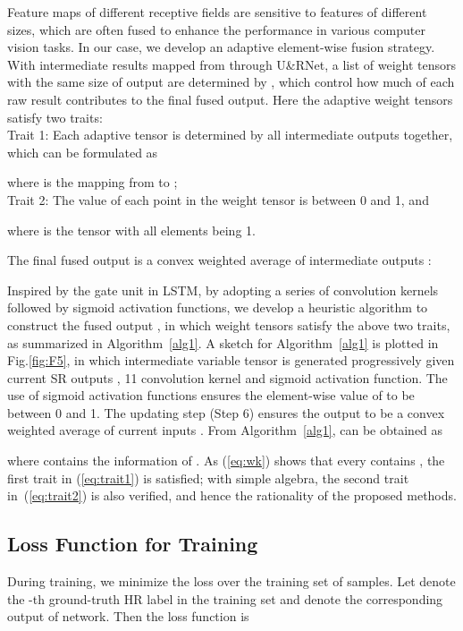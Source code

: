 \documentclass[journal]{IEEEtran}
\begin{document}
Feature maps of different receptive fields are sensitive to features of different sizes, which are often fused to enhance the performance in various computer vision tasks. In our case, we develop an adaptive element-wise fusion strategy. With  intermediate results  mapped from  through U\&RNet, a list of weight tensors  with the same size of output are determined by , which control how much of each raw result contributes to the final fused output. Here the adaptive weight tensors satisfy two traits:\\
Trait 1: Each adaptive tensor is determined by all intermediate outputs together, which can be formulated as

where  is the mapping from  to ;\\
Trait 2: The value of each point in the weight tensor is between 0 and 1, and

where  is the tensor with all elements being 1. 

The final fused output  is a convex weighted average of intermediate outputs : 


Inspired by the gate unit in LSTM, by adopting a series of  convolution kernels followed by sigmoid activation functions, we develop a heuristic algorithm to construct the fused output , in which weight tensors satisfy the above two traits, as summarized in Algorithm~\ref{alg1}.
A sketch for Algorithm~\ref{alg1} is plotted in Fig.\ref{fig:F5}, in which intermediate variable tensor  is generated progressively given current SR outputs , 11 convolution kernel  and sigmoid activation function. The use of sigmoid activation functions ensures the element-wise value of  to be between 0 and 1. The updating step (Step 6) ensures the output to be a convex weighted average of current inputs .
From Algorithm~\ref{alg1},  can be obtained as

where  contains the information of . As (\ref{eq:wk}) shows that every  contains , the first trait in (\ref{eq:trait1}) is satisfied; with simple algebra, the second trait in~(\ref{eq:trait2}) is also verified, and hence the rationality of the proposed methods.


\subsection{Loss Function for Training}

During training, we minimize the  loss  over the training set of  samples.
Let  denote the -th ground-truth HR label in the training set and  denote the corresponding output of network. Then the loss function   is
\end{document}
